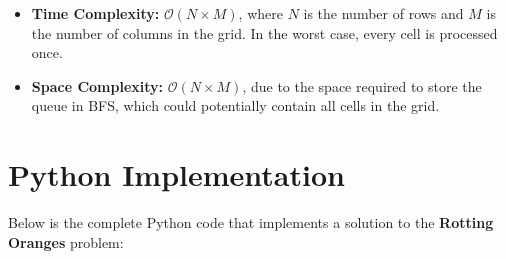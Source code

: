 \begin{itemize}
    \item \textbf{Time Complexity:} \(\mathcal{O}(N \times M)\), where \(N\) is the number of rows and \(M\) is the number of columns in the grid. In the worst case, every cell is processed once.
    \item \textbf{Space Complexity:} \(\mathcal{O}(N \times M)\), due to the space required to store the queue in BFS, which could potentially contain all cells in the grid.
\end{itemize}

\newpage %
\section*{Python Implementation}


Below is the complete Python code that implements a solution to the \textbf{Rotting Oranges} problem:

